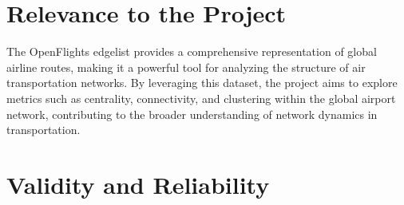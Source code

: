 \documentclass[12pt]{article}
\begin{document}
\section{Relevance to the Project}

The OpenFlights edgelist provides a comprehensive representation of global airline routes, making it a powerful tool for analyzing the structure of air transportation networks. By leveraging this dataset, the project aims to explore metrics such as centrality, connectivity, and clustering within the global airport network, contributing to the broader understanding of network dynamics in transportation.



\section{Validity and Reliability}
\end{document}
